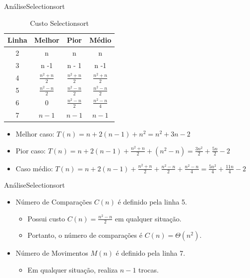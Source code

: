 \documentclass[aspectratio=169]{beamer}
\begin{document}
\begin{frame}[fragile]{Análise}{Selectionsort}
\begin{table}[]
\centering
\caption{Custo Selectionsort}
\label{Custo Bubblesort}
\begin{tabular}{c|ccc}
Linha  &  Melhor  &  Pior  &  Médio  \\
\hline
2       & n  & n  &  n \\
3       & n -1  & n - 1 &  n -1 \\
4       & $\frac{n^2 + n}{2}$  & $\frac{n^2 + n}{2}$  & $\frac{n^2 + n}{2}$ \\
5       & $\frac{n^2 - n}{2}$ &$\frac{n^2 - n}{2}$& $\frac{n^2 - n}{2}$ \\ 
6       & 0 &$\frac{n^2 - n}{2}$& $\frac{n^2 - n}{4}$ \\ 
7       & $n-1$ &$n-1$& $n-1$ \\ 
\end{tabular}

\begin{itemize}
 \item Melhor caso: $T(n) = n + 2(n-1) + n^2 = n^2 + 3n -2$

 \item Pior caso: $T(n) = n + 2(n-1) + \frac{n^2+n}{2} + (n^2 - n) = \frac{3n^2}{2} + \frac{5n}{2} - 2$
 
 \item Caso médio: $T(n) = n + 2(n-1) + \frac{n^2 + n}{2} + \frac{n^2 - n}{2} + \frac{n^2 - n}{4} = \frac{5n^2}{4} +\frac{11n}{4}-2$
\end{itemize}

\end{table} 
 
\end{frame}



\begin{frame}[fragile]{Análise}{Selectionsort}
\begin{itemize}
 \item Número de Comparações $C(n)$ é definido pela linha 5.
 \begin{itemize}
 \item Possui custo $C(n) = \frac{n^2-n}{2}$ em qualquer situação.
 \item Portanto, o número de comparações é $C(n) = \Theta(n^2)$.
 \end{itemize}
\item Número de Movimentos $M(n)$ é definido pela linha 7.
 \begin{itemize}
 \item Em qualquer situação, realiza $n-1$ trocas.
 \end{itemize} 
\end{itemize}

\end{frame}
\end{document}
